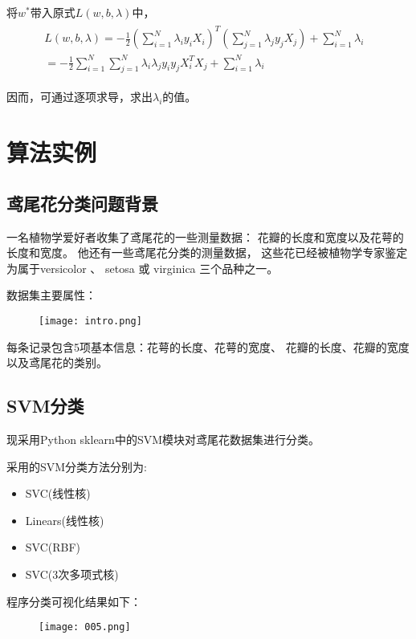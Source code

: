 \documentclass[12pt]{article}
\begin{document}
将$w^\ast$带入原式$L(w,b,\lambda)$中，
\begin{align}
	\begin{array}{lr}
		L(w,b,\lambda)=-\frac{1}{2}(\sum_{i=1}^N\lambda_iy_iX_i)^T(\sum_{j=1}^N\lambda_jy_jX_j)+\sum_{i=1}^N\lambda_i &  \\
		=-\frac{1}{2}\sum_{i=1}^N\sum_{j=1}^N\lambda_i\lambda_jy_iy_jX_i^TX_j+\sum_{i=1}^N\lambda_i&  
		\end{array}
\end{align}

因而，可通过逐项求导，求出$\lambda_i$的值。

\newpage
\section{算法实例}
\subsection{鸢尾花分类问题背景}
一名植物学爱好者收集了鸢尾花的一些测量数据：
花瓣的长度和宽度以及花萼的长度和宽度。
他还有一些鸢尾花分类的测量数据，
这些花已经被植物学专家鉴定为属于versicolor 、 
setosa 或 virginica 三个品种之一。

数据集主要属性：
\begin{figure}[h]
	\centering
	\texttt{[image: intro.png]}
\end{figure}

每条记录包含5项基本信息：花萼的长度、花萼的宽度、
花瓣的长度、花瓣的宽度以及鸢尾花的类别。

\subsection{SVM分类}
现采用Python sklearn中的SVM模块对鸢尾花数据集进行分类。

采用的SVM分类方法分别为:
\begin{itemize}
	\item SVC(线性核)
	\item Linears(线性核)
	\item SVC(RBF)
	\item SVC(3次多项式核)
\end{itemize}

程序分类可视化结果如下：

\begin{figure}[H]
	\centering
	\texttt{[image: 005.png]}
\end{figure}
\end{document}
